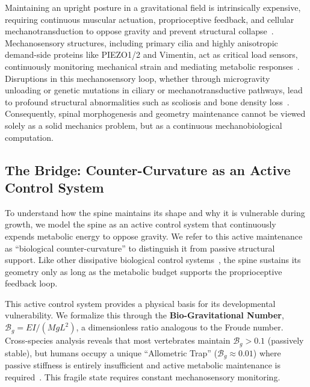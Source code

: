 Maintaining an upright posture in a gravitational field is intrinsically expensive, requiring continuous muscular actuation, proprioceptive feedback, and cellular mechanotransduction to oppose gravity and prevent structural collapse~\cite{latimer2005upright, bastien2013unifying, govey2013gravity, proske2012proprioceptive}. Mechanosensory structures, including primary cilia and highly anisotropic demand-side proteins like PIEZO1/2 and Vimentin, act as critical load sensors, continuously monitoring mechanical strain and mediating metabolic responses~\cite{assaraf2020piezo2, coste2010piezo, hu2019vimentin}. Disruptions in this mechanosensory loop, whether through microgravity unloading or genetic mutations in ciliary or mechanotransductive pathways, lead to profound structural abnormalities such as scoliosis and bone density loss~\cite{lv2023yap, djebar2024astrogliosis, ramli2024piezo1}. Consequently, spinal morphogenesis and geometry maintenance cannot be viewed solely as a solid mechanics problem, but as a continuous mechanobiological computation.

\subsection{The Bridge: Counter-Curvature as an Active Control System}
To understand how the spine maintains its shape and why it is vulnerable during growth, we model the spine as an active control system that continuously expends metabolic energy to oppose gravity. We refer to this active maintenance as ``biological counter-curvature'' to distinguish it from passive structural support. Like other dissipative biological control systems~\cite{prigogine1977self, friston2013life}, the spine sustains its geometry only as long as the metabolic budget supports the proprioceptive feedback loop.

This active control system provides a physical basis for its developmental vulnerability. We formalize this through the \textbf{Bio-Gravitational Number}, $\mathcal{B}_g = EI / (M g L^2)$, a dimensionless ratio analogous to the Froude number. Cross-species analysis reveals that most vertebrates maintain $\mathcal{B}_g > 0.1$ (passively stable), but humans occupy a unique ``Allometric Trap'' ($\mathcal{B}_g \approx 0.01$) where passive stiffness is entirely insufficient and active metabolic maintenance is required~\cite{lovejoy2005hominid, Meyer_2021}. This fragile state requires constant mechanosensory monitoring.


